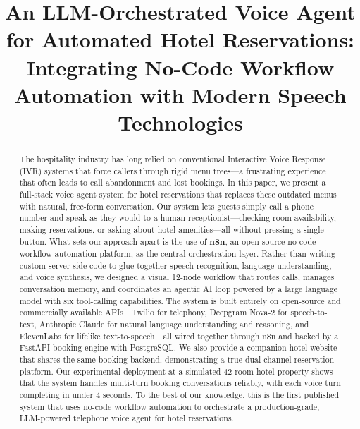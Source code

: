 \documentclass[conference]{IEEEtran}
\begin{document}
\title{An LLM-Orchestrated Voice Agent for Automated Hotel Reservations: Integrating No-Code Workflow Automation with Modern Speech Technologies}

\author{
}

\maketitle

\begin{abstract}
The hospitality industry has long relied on conventional Interactive Voice Response (IVR) systems that force callers through rigid menu trees---a frustrating experience that often leads to call abandonment and lost bookings. In this paper, we present a full-stack voice agent system for hotel reservations that replaces these outdated menus with natural, free-form conversation. Our system lets guests simply call a phone number and speak as they would to a human receptionist---checking room availability, making reservations, or asking about hotel amenities---all without pressing a single button. What sets our approach apart is the use of \textbf{n8n}, an open-source no-code workflow automation platform, as the central orchestration layer. Rather than writing custom server-side code to glue together speech recognition, language understanding, and voice synthesis, we designed a visual 12-node workflow that routes calls, manages conversation memory, and coordinates an agentic AI loop powered by a large language model with six tool-calling capabilities. The system is built entirely on open-source and commercially available APIs---Twilio for telephony, Deepgram Nova-2 for speech-to-text, Anthropic Claude for natural language understanding and reasoning, and ElevenLabs for lifelike text-to-speech---all wired together through n8n and backed by a FastAPI booking engine with PostgreSQL. We also provide a companion hotel website that shares the same booking backend, demonstrating a true dual-channel reservation platform. Our experimental deployment at a simulated 42-room hotel property shows that the system handles multi-turn booking conversations reliably, with each voice turn completing in under 4 seconds. To the best of our knowledge, this is the first published system that uses no-code workflow automation to orchestrate a production-grade, LLM-powered telephone voice agent for hotel reservations.
\end{abstract}
\end{document}
